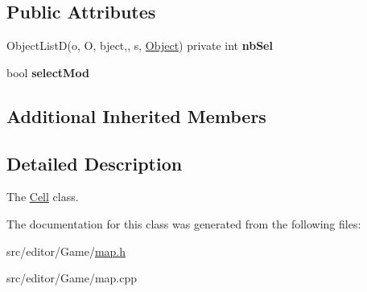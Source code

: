 \subsection*{Public Attributes}
\begin{DoxyCompactItemize}
\item 
\hypertarget{class_cell_a70f60ede53fb663eb11dd543211bf4cf}{}\label{class_cell_a70f60ede53fb663eb11dd543211bf4cf} 
Object\+ListD(o, O, bject,, s, \hyperlink{class_object}{Object}) private int {\bfseries nb\+Sel}
\item 
\hypertarget{class_cell_a5891847674379c2fd25a4d08962a21ba}{}\label{class_cell_a5891847674379c2fd25a4d08962a21ba} 
bool {\bfseries select\+Mod}
\end{DoxyCompactItemize}
\subsection*{Additional Inherited Members}


\subsection{Detailed Description}
The \hyperlink{class_cell}{Cell} class. 

The documentation for this class was generated from the following files\+:\begin{DoxyCompactItemize}
\item 
src/editor/\+Game/\hyperlink{map_8h}{map.\+h}\item 
src/editor/\+Game/map.\+cpp\end{DoxyCompactItemize}
